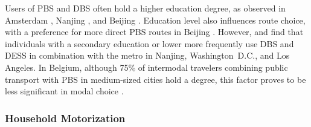\begin{refsegment}
Users of \acrshort{PBS} and \acrshort{DBS} often hold a higher education degree, as observed in Amsterdam \textcolor{blue}{\autocite[47-49]{nat_bicycle_2018}}, Nanjing \textcolor{blue}{\autocite[5]{yang_empirical_2016}}, and Beijing \textcolor{blue}{\autocite[10]{guo_exploring_2023}}. Education level also influences route choice, with a preference for more direct \acrshort{PBS} routes in Beijing \textcolor{blue}{\autocite[10]{zhao_public_2022}}. However, \textcolor{blue}{\textcite[11]{liu_use_2020}} and \textcolor{blue}{\textcite[9, 12]{yan_evaluating_2023}} find that individuals with a secondary education or lower more frequently use \acrshort{DBS} and \acrshort{DESS} in combination with the metro in Nanjing, Washington~D.C., and Los Angeles. In Belgium, although 75\% of intermodal travelers combining public transport with \acrshort{PBS} in medium-sized cities hold a degree, this factor proves to be less significant in modal choice \textcolor{blue}{\autocite[6, 8]{adnan_last-mile_2019}}.%

\subsubsection*{Household Motorization
    \label{chap2:motorisation}
    }


\end{refsegment}
